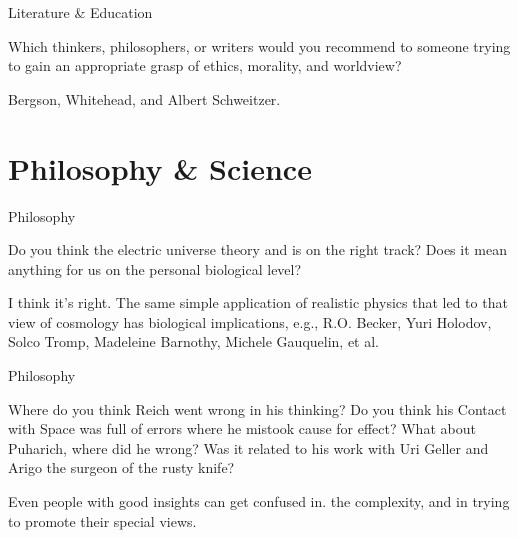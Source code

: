 \documentclass[11pt,oneside,openany,extrafontsizes]{memoir}
\begin{document}
\begin{qaexchange}{Literature \& Education}

    \begin{question}
        Which thinkers, philosophers, or writers would you recommend to someone trying to gain an appropriate grasp of ethics, morality, and worldview?
    \end{question}

    \begin{answer}
       Bergson, Whitehead, and Albert Schweitzer.
    \end{answer}
\end{qaexchange}

\section{Philosophy \& Science}

\begin{qaexchange}{Philosophy}

    \begin{question}
        Do you think the electric universe theory and  is on the right track? Does it mean anything for us on the personal biological level?
    \end{question}

    \begin{answer}
      I think it's right. The same simple application of realistic physics that led to that view of cosmology has biological implications, e.g., R.O. Becker, Yuri Holodov, Solco Tromp, Madeleine Barnothy, Michele Gauquelin, et al.
    \end{answer}
\end{qaexchange}

\begin{qaexchange}{Philosophy}

    \begin{question}
        Where do you think Reich went wrong in his thinking? Do you think his Contact with Space was full of errors where he mistook cause for effect? What about Puharich, where did he wrong? Was it related to his work with Uri Geller and Arigo the surgeon of the rusty knife?
    \end{question}

    \begin{answer}
       Even people with good insights can get confused in. the complexity, and in trying to promote their special views.
    \end{answer}
\end{qaexchange}
\end{document}
